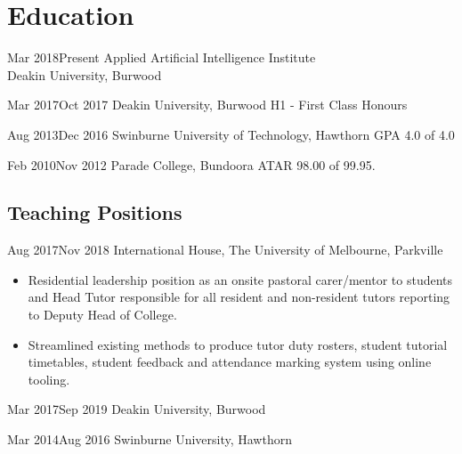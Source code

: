 \section{Education}

\begin{multicols}{2}

{Mar 2018}{Present}
{Applied Artificial Intelligence Institute\\Deakin University, Burwood}
{}

\vspace{-1em}
{Mar 2017}{Oct 2017}
{Deakin University, Burwood}
{H1 - First Class Honours}

\columnbreak

{Aug 2013}{Dec 2016}
{Swinburne University of Technology, Hawthorn}
{GPA 4.0 of 4.0}

{Feb 2010}{Nov 2012}
{Parade College, Bundoora}
{ATAR 98.00 of 99.95.}

\end{multicols}

\subsection{Teaching Positions}

{Aug 2017}{Nov 2018}
{International House, The University of Melbourne, Parkville}
{}
{}
\vspace{-1\bigskipamount}
\small
\begin{itemize}
  \item Residential leadership position as an onsite pastoral carer/mentor to students and Head Tutor responsible for all resident and non-resident tutors reporting to Deputy Head of College.
  \item Streamlined existing methods to produce tutor duty rosters, student tutorial timetables, student feedback and attendance marking system using online tooling.
\end{itemize}

\begin{multicols}{2}

{Mar 2017}{Sep 2019}
{Deakin University, Burwood}
{}
{}

{Mar 2014}{Aug 2016}
{Swinburne University, Hawthorn}
{}
{}
\end{multicols}

\vspace{-1\bigskipamount}

